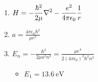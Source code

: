 

\vspace*{\fill}
\centering

\begin{enumerate}
    \item $\displaystyle H = -\frac{\hbar^2}{2\mu}\laplacian - \frac{e^2}{4\pi\epsilon_{0}}\frac{1}{r}$ 
    \item $\displaystyle a = \frac{4 \pi \epsilon_0 \hbar^2}{\mu e^2}$
    \item $\displaystyle E_{n} = -\frac{\hbar^2}{2\mu a^2n^2} = \frac{\mu e^{4}}{2(4\pi\epsilon_0)^2\hbar^2n^2}$
        \begin{itemize}
            \item $E_{1} = \SI{13.6}{\eV}$ 
        \end{itemize}
\end{enumerate}

\centering
\vspace*{\fill}

